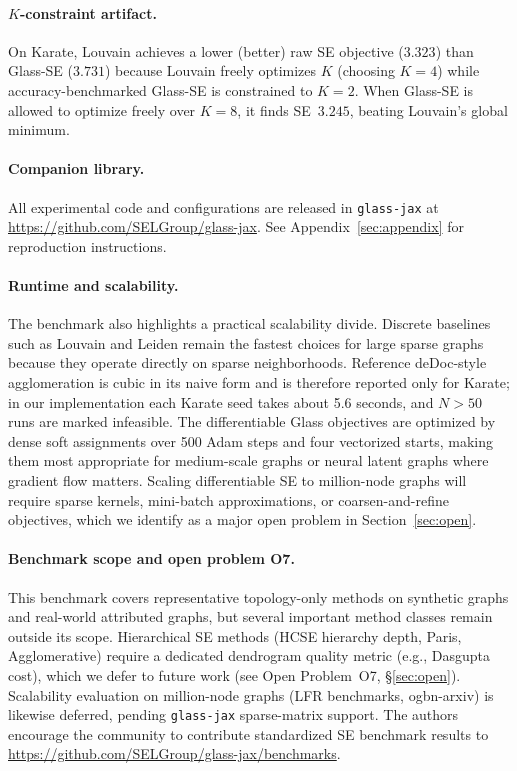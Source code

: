\paragraph{$K$-constraint artifact.}
On Karate, Louvain achieves a lower (better) raw SE objective ($3.323$) than
Glass-SE ($3.731$) because Louvain freely optimizes $K$ (choosing $K{=}4$)
while accuracy-benchmarked Glass-SE is constrained to $K{=}2$.
When Glass-SE is allowed to optimize freely over $K{=}8$, it finds SE~$3.245$,
beating Louvain's global minimum.

\paragraph{Companion library.}
All experimental code and configurations are released in \texttt{glass-jax}
at \url{https://github.com/SELGroup/glass-jax}.
See Appendix~\ref{sec:appendix} for reproduction instructions.

\paragraph{Runtime and scalability.}
The benchmark also highlights a practical scalability divide.
Discrete baselines such as Louvain and Leiden remain the fastest choices for
large sparse graphs because they operate directly on sparse neighborhoods.
Reference deDoc-style agglomeration is cubic in its naive form and is therefore
reported only for Karate; in our implementation each Karate seed takes about
5.6 seconds, and $N{>}50$ runs are marked infeasible.
The differentiable Glass objectives are optimized by dense soft assignments
over 500 Adam steps and four vectorized starts, making them most appropriate
for medium-scale graphs or neural latent graphs where gradient flow matters.
Scaling differentiable SE to million-node graphs will require sparse kernels,
mini-batch approximations, or coarsen-and-refine objectives, which we identify
as a major open problem in Section~\ref{sec:open}.

\paragraph{Benchmark scope and open problem O7.}
This benchmark covers representative topology-only methods on synthetic graphs
and real-world attributed graphs, but several important method classes remain
outside its scope.
Hierarchical SE methods (HCSE hierarchy depth, Paris, Agglomerative) require
a dedicated dendrogram quality metric (e.g., Dasgupta cost), which we defer to
future work (see Open Problem~O7, \S\ref{sec:open}).
Scalability evaluation on million-node graphs (LFR benchmarks, ogbn-arxiv) is
likewise deferred, pending \texttt{glass-jax} sparse-matrix support.
The authors encourage the community to contribute standardized SE benchmark
results to \url{https://github.com/SELGroup/glass-jax/benchmarks}.
